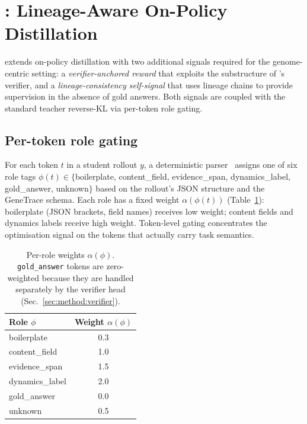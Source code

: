 \section{\evoopd: Lineage-Aware On-Policy Distillation}
\label{sec:method}

\evoopd{} extends on-policy distillation with two additional signals
required for the genome-centric setting: a \emph{verifier-anchored
reward} that exploits the substructure of \genetrace's verifier, and a
\emph{lineage-consistency self-signal} that uses lineage chains to provide
supervision in the absence of gold answers. Both signals are coupled with
the standard teacher reverse-KL via per-token role gating.

\subsection{Per-token role gating}
\label{sec:method:phi}

For each token $t$ in a student rollout $y$, a deterministic
parser~\citep{evo_opd_parser_impl} assigns one of six role tags
$\phi(t) \in \{$boilerplate, content\_field, evidence\_span,
dynamics\_label, gold\_answer, unknown$\}$ based on the rollout's JSON
structure and the GeneTrace schema. Each role has a fixed weight $\alpha(\phi(t))$
(Table~\ref{tab:phi_weights}): boilerplate (JSON brackets, field names)
receives low weight; content fields and dynamics labels receive high
weight. Token-level gating concentrates the optimisation signal on the
tokens that actually carry task semantics.

\begin{table}[t]
  \centering
  \small
  \begin{tabular}{lc}
    \toprule
    Role $\phi$ & Weight $\alpha(\phi)$ \\
    \midrule
    boilerplate     & 0.3 \\
    content\_field  & 1.0 \\
    evidence\_span  & 1.5 \\
    dynamics\_label & 2.0 \\
    gold\_answer    & 0.0 \\
    unknown         & 0.5 \\
    \bottomrule
  \end{tabular}
  \caption{Per-role weights $\alpha(\phi)$. \texttt{gold\_answer} tokens
  are zero-weighted because they are handled separately by the verifier
  head (Sec.~\ref{sec:method:verifier}).}
  \label{tab:phi_weights}
\end{table}

